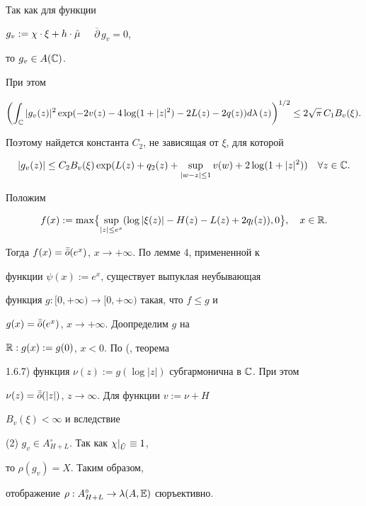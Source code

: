 \begin{pf}
Так как для функции


$g_v:=\chi\cdot\xi+h\cdot\Hat\mu$ $\quad\overline\partial\, g_v=0$, 


то $g_v\in A(\Bbb C)$. 


При этом 


$$ 


\biggl(\int_{\Bbb 


C}|g_v(z)|^2\exp(-2v(z)-4\log(1+|z|^2)-2L(z)-2q(z))d\lambda\,(z)\biggr)^{1/2} 


\le 2\sqrt\pi \, C_1 B_v(\xi). 


$$ 


Поэтому найдется константа $C_2$, не зависящая от $\xi$, для которой 


\begin{equation} 


|g_v(z)|\le C_2B_v(\xi)\exp(L(z)+q_2(z)+ 


\sup_{|w-z|\le 1}v(w)+2\log(1+|z|^2))\quad \forall z\in\Bbb C. 


\end{equation} 


Положим 


$$ 


f(x):=\max\bigl\{\sup_{|z|\le e^x}(\log|\xi(z)|-H(z)-L(z)+2q_l(z)),0 


\bigr\},\quad x\in\Bbb R. 


$$ 


Тогда $f(x)=\Bar{\Bar o}(e^x)$, $x\to +\infty$. По лемме 4, примененной к 


функции $\psi(x):=e^x$, существует выпуклая неубывающая 


функция $g:[0,+\infty)\to [0,+\infty)$ такая, что $f\le g$ и 


$g(x)=\Bar{\Bar o}(e^x)$, $x\to +\infty$. Доопределим $g$ на 


$\Bbb R:g(x):=g(0)$, $x<0$. По (\cite{Her}, теорема 


1.6.7) функция $\nu(z):=g(\log|z|)$ субгармонична в $\Bbb C$. При этом 


$\nu(z)=\Bar{\Bar o}(|z|)$, $z\to\infty$. Для функции $v:=\nu+H$ 


$B_v(\xi)<\infty$ и вследствие 


(2) $g_v\in A^\circ_{H+L}$. Так как $\chi\vert_{\Tilde U}\equiv 1$, 


то $\rho(g_v)=X$. Таким образом, 


отображение $\rho :A^\circ_{H+L}\to\lambda(A,\Bbb E)$ сюръективно. 



\end{pf}
